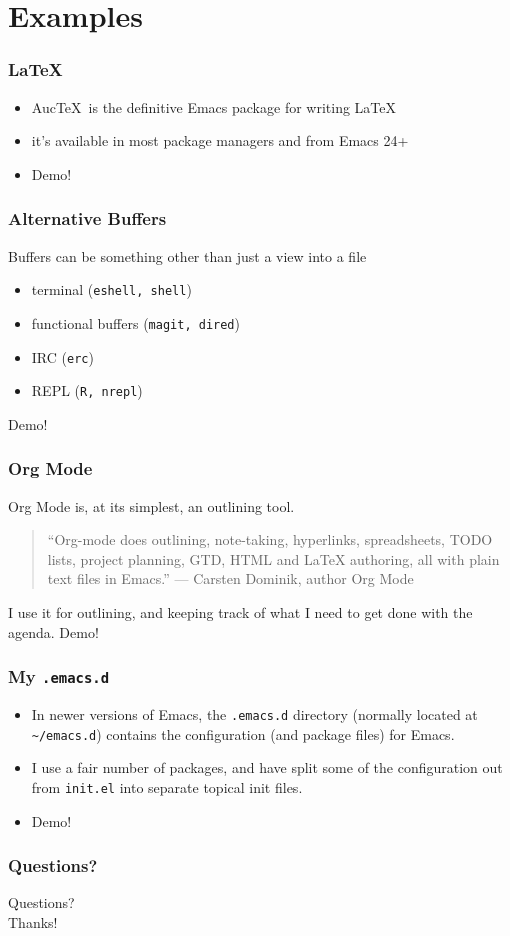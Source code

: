 \documentclass{beamer}
\begin{document}
\section{Examples}
\begin{frame}
  \frametitle{\LaTeX}
  \begin{itemize}
  \item Auc\TeX\ is the definitive Emacs package for writing \LaTeX
  \item it's available in most package managers and from Emacs 24+
  \item Demo!
  \end{itemize}
\end{frame}

\begin{frame}
  \frametitle{Alternative Buffers}
  Buffers can be something other than just a view into a file
  \begin{itemize}
  \item terminal ({\tt eshell, shell})
  \item functional buffers ({\tt magit, dired})
  \item IRC ({\tt erc})
  \item REPL ({\tt R, nrepl})
  \end{itemize}
  Demo!
\end{frame}
\begin{frame}
  \frametitle{Org Mode}
  Org Mode is, at its simplest, an outlining tool.

  \begin{quote}
    ``Org-mode does outlining, note-taking, hyperlinks, spreadsheets,
    TODO lists, project planning, GTD, HTML and LaTeX authoring, all
    with plain text files in Emacs.'' --- Carsten Dominik, author Org
    Mode
  \end{quote}
  I use it for outlining, and keeping track of what I need to get done
  with the agenda.
  \vfill
  Demo!
\end{frame}
\begin{frame}
  \frametitle{My {\tt .emacs.d}}
  \begin{itemize}
  \item In newer versions of Emacs, the {\tt .emacs.d} directory (normally
  located at {\tt \textasciitilde/emacs.d}) contains the configuration (and package
  files) for Emacs.
  \item I use a fair number of packages, and have split some of the
  configuration out from {\tt init.el} into separate topical init
  files.
  \item Demo!
  \end{itemize}

\end{frame}

\begin{frame}
  \frametitle{Questions?}
  \begin{center}
  {\large Questions?} \\
  \vfill
  {\large Thanks!}
  \end{center}
\end{frame}
\end{document}

